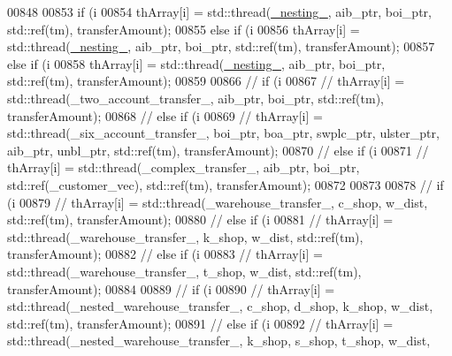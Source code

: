 \begin{DoxyCode}
00848 
00853         \textcolor{keywordflow}{if} (i %
00854             thArray[i] = std::thread(\hyperlink{main_8cpp_a5675cb594d74aa1bf5e80233370ffd81_a5675cb594d74aa1bf5e80233370ffd81}{\_nesting\_}, aib\_ptr, boi\_ptr, std::ref(tm), transferAmount);
00855         \textcolor{keywordflow}{else} \textcolor{keywordflow}{if} (i %
00856             thArray[i] = std::thread(\hyperlink{main_8cpp_a5675cb594d74aa1bf5e80233370ffd81_a5675cb594d74aa1bf5e80233370ffd81}{\_nesting\_}, aib\_ptr, boi\_ptr, std::ref(tm), transferAmount);
00857         \textcolor{keywordflow}{else} \textcolor{keywordflow}{if} (i %
00858             thArray[i] = std::thread(\hyperlink{main_8cpp_a5675cb594d74aa1bf5e80233370ffd81_a5675cb594d74aa1bf5e80233370ffd81}{\_nesting\_}, aib\_ptr, boi\_ptr, std::ref(tm), transferAmount);
00859 
00866         \textcolor{comment}{//    if (i %
00867         \textcolor{comment}{//        thArray[i] = std::thread(\_two\_account\_transfer\_, aib\_ptr, boi\_ptr, std::ref(tm),
       transferAmount);}
00868         \textcolor{comment}{//    else if (i %
00869         \textcolor{comment}{//        thArray[i] = std::thread(\_six\_account\_transfer\_, boi\_ptr, boa\_ptr, swplc\_ptr, ulster\_ptr,
       aib\_ptr, unbl\_ptr, std::ref(tm), transferAmount);}
00870         \textcolor{comment}{//    else if (i %
00871         \textcolor{comment}{//        thArray[i] = std::thread(\_complex\_transfer\_, aib\_ptr, boi\_ptr, std::ref(\_customer\_vec),
       std::ref(tm), transferAmount);}
00872 
00873 
00878         \textcolor{comment}{//        if (i %
00879         \textcolor{comment}{//            thArray[i] = std::thread(\_warehouse\_transfer\_, c\_shop, w\_dist, std::ref(tm),
       transferAmount);}
00880         \textcolor{comment}{//        else if (i %
00881         \textcolor{comment}{//            thArray[i] = std::thread(\_warehouse\_transfer\_, k\_shop, w\_dist, std::ref(tm),
       transferAmount);}
00882         \textcolor{comment}{//        else if (i %
00883         \textcolor{comment}{//            thArray[i] = std::thread(\_warehouse\_transfer\_, t\_shop, w\_dist, std::ref(tm),
       transferAmount);}
00884 
00889         \textcolor{comment}{//        if (i %
00890         \textcolor{comment}{//            thArray[i] = std::thread(\_nested\_warehouse\_transfer\_, c\_shop, d\_shop, k\_shop, w\_dist,
       std::ref(tm), transferAmount);}
00891         \textcolor{comment}{//        else if (i %
00892         \textcolor{comment}{//            thArray[i] = std::thread(\_nested\_warehouse\_transfer\_, k\_shop, s\_shop, t\_shop, w\_dist,
}}}}}}}}}
\end{DoxyCode}
